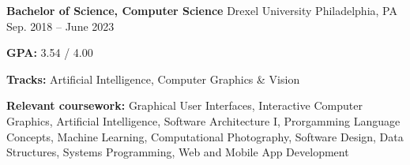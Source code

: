 \begin{cventries}
    \cventry
    {\textbf{Bachelor of Science, Computer Science}} %
    {Drexel University} %
    {Philadelphia, PA} %
    {Sep. 2018 -- June 2023} %
    {
      \begin{cvitems} %
        \item {\textbf{GPA:} 3.54 / 4.00}
        \item {\textbf{Tracks:} Artificial Intelligence, Computer Graphics \& Vision}
        \item {\color{darktext} \textbf{Relevant coursework:}
                    Graphical User Interfaces,
                    Interactive Computer Graphics,
                    Artificial Intelligence,
                    Software Architecture I,
                    Prorgamming Language Concepts,
                    Machine Learning, 
                    Computational Photography, 
                    Software Design,
                    Data Structures,
                    Systems Programming,
                    Web and Mobile App Development
              }
      \end{cvitems}}

\end{cventries}
